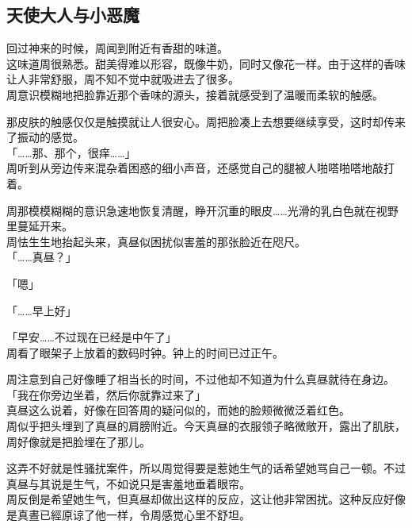 \subsection{天使大人与小恶魔}

回过神来的时候，周闻到附近有香甜的味道。\\

这味道周很熟悉。甜美得难以形容，既像牛奶，同时又像花一样。由于这样的香味让人非常舒服，周不知不觉中就吸进去了很多。\\

周意识模糊地把脸靠近那个香味的源头，接着就感受到了温暖而柔软的触感。

那皮肤的触感仅仅是触摸就让人很安心。周把脸凑上去想要继续享受，这时却传来了振动的感觉。\\

「……那、那个，很痒……」\\

周听到从旁边传来混杂着困惑的细小声音，还感觉自己的腿被人啪嗒啪嗒地敲打着。

周那模模糊糊的意识急速地恢复清醒，睁开沉重的眼皮……光滑的乳白色就在视野里蔓延开来。\\

周怯生生地抬起头来，真昼似困扰似害羞的那张脸近在咫尺。\\

「……真昼？」

「嗯」

「……早上好」

「早安……不过现在已经是中午了」\\

周看了眼架子上放着的数码时钟。钟上的时间已过正午。

周注意到自己好像睡了相当长的时间，不过他却不知道为什么真昼就待在身边。\\

「我在你旁边坐着，然后你就靠过来了」\\

真昼这么说着，好像在回答周的疑问似的，而她的脸颊微微泛着红色。\\

周似乎把头埋到了真昼的肩膀附近。今天真昼的衣服领子略微敞开，露出了肌肤，周好像就是把脸埋在了那儿。

这弄不好就是性骚扰案件，所以周觉得要是惹她生气的话希望她骂自己一顿。不过真昼与其说是生气，不如说只是害羞地垂着眼帘。\\

周反倒是希望她生气，但真昼却做出这样的反应，这让他非常困扰。这种反应好像是真晝已經原谅了他一样，令周感觉心里不舒坦。\\

